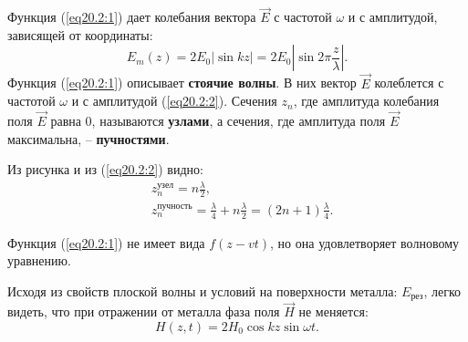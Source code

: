 	Функция (\ref{eq20.2:1}) дает колебания вектора \( \vec{E} \) с частотой
    \( \omega \) и с амплитудой, зависящей от координаты:
	\begin{equation}
		E_m(z) = 2E_0|\sin kz| = 2E_0|\sin2\pi\frac{z}{\lambda}|.
        \label{eq20.2:2}
	\end{equation}
	Функция (\ref{eq20.2:1}) описывает \textbf{стоячие волны}. В них вектор
    \( \vec{E} \) колеблется с частотой \( \omega \) и с амплитудой
    (\ref{eq20.2:2}). Сечения \( z_n \), где амплитуда колебания поля
    \( \vec{E} \) равна 0, называются \textbf{узлами}, а сечения, где амплитуда
    поля \( \vec{E} \) максимальна, -- \textbf{пучностями}.
	
	Из рисунка и из (\ref{eq20.2:2}) видно:
    \begin{align*}
        & z_n^\text{узел} = n\frac{\lambda}{2}, \\
        & z_n^\text{пучность} = \frac{\lambda}{4} + n\frac{\lambda}{2} =
            (2n + 1)\frac{\lambda}{4}.
    \end{align*}
	
	\begin{remark}
        Функция (\ref{eq20.2:1}) не имеет вида \( f(z - vt) \), но она
        удовлетворяет волновому уравнению.
	\end{remark}
	
	\begin{remark}
        Исходя из свойств плоской волны и условий на поверхности металла:
        \( E_\textit{рез} \), легко видеть, что при отражении от металла фаза
        поля \( \vec{H} \) не меняется:
	    \[
            H(z, t) = 2H_0\cos kz\sin\omega t.
        \]
	\end{remark}
